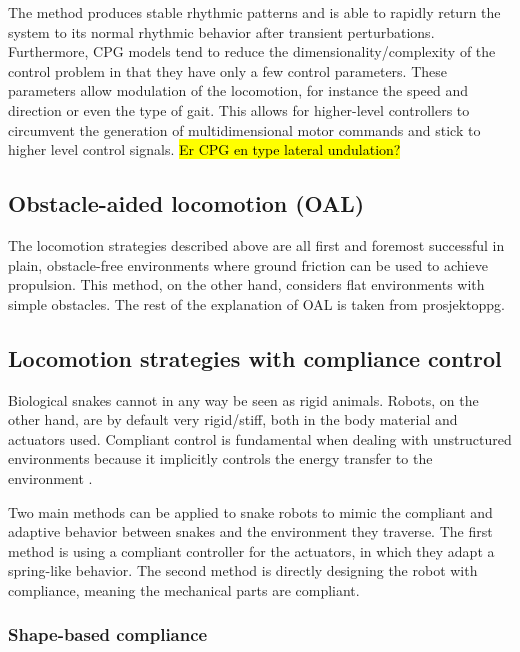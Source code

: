 The method produces stable rhythmic patterns and is able to rapidly return the system to its normal rhythmic behavior after transient perturbations. Furthermore, CPG models tend to reduce the dimensionality/complexity of the control problem in that they have only a few control parameters. These parameters allow modulation of the locomotion, for instance the speed and direction or even the type of gait. This allows for higher-level controllers to circumvent the generation of multidimensional motor commands and stick to higher level control signals.
\hl{Er CPG en type lateral undulation?}

\subsection{Obstacle-aided locomotion (OAL)}

The locomotion strategies described above are all first and foremost successful in plain, obstacle-free environments where ground friction can be used to achieve propulsion. This method, on the other hand, considers flat environments with simple obstacles. The rest of the explanation of OAL is taken from \cite{} prosjektoppg.





\subsection{Locomotion strategies with compliance control}

Biological snakes cannot in any way be seen as rigid animals. Robots, on the other hand, are by default very rigid/stiff, both in the body material and actuators used.
Compliant control is fundamental when dealing with unstructured environments because it implicitly controls the energy transfer to the environment \cite{calanca2015review}.

Two main methods can be applied to snake robots to mimic the compliant and adaptive behavior between snakes and the environment they traverse. The first method is using a compliant controller for the actuators, in which they adapt a spring-like behavior. The second method is directly designing the robot with compliance, meaning the mechanical parts are compliant.

\subsubsection{Shape-based compliance}

